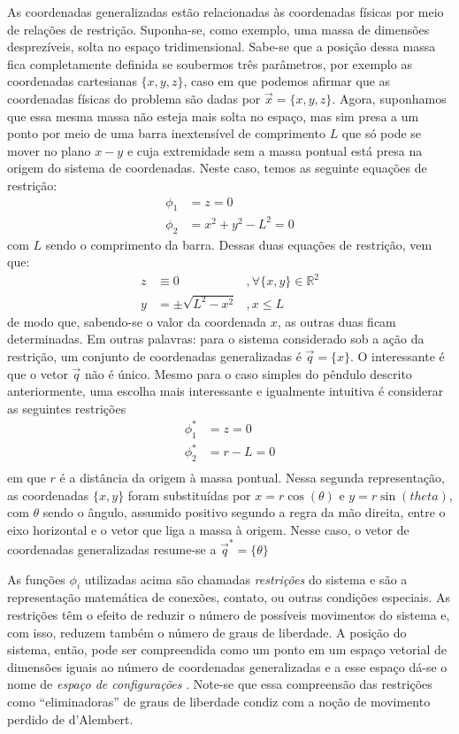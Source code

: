 As coordenadas generalizadas estão relacionadas às coordenadas físicas por meio de relações de restrição. 
Suponha-se, como exemplo, uma massa de dimensões desprezíveis, solta no espaço tridimensional. Sabe-se que a posição dessa massa fica completamente definida se soubermos três parâmetros, por exemplo as coordenadas cartesianas $\{x,y,z\}$, caso em que podemos afirmar que as coordenadas físicas do problema são dadas por $\vec{x} = \{x,y,z\}$. Agora, suponhamos que essa mesma massa não esteja mais solta no espaço, mas sim presa a um ponto por meio de uma barra inextensível de comprimento $L$ que só pode se mover no plano $x-y$ e cuja extremidade sem a massa pontual está presa na origem do sistema de coordenadas. Neste caso, temos as seguinte equações de restrição:
\begin{align}
 \phi_1 &= z = 0\\
 \phi_2 &= x^2 + y^2 - L^2 = 0
\end{align}
com $L$ sendo o comprimento da barra. Dessas duas equações de restrição, vem que:
\begin{align}
 z &\equiv 0 &, \forall \{x,y\} \in \mathbb{R}^2 \\
 y &= \pm \sqrt{L^2 - x^2} &, x \leq L
\end{align}
de modo que, sabendo-se o valor da coordenada $x$, as outras duas ficam determinadas. Em outras palavras: para o sistema considerado sob a ação da restrição, um conjunto de coordenadas generalizadas é $\vec{q} = \{x\}$. O interessante é que o vetor $\vec{q}$ não é único. Mesmo para o caso simples do pêndulo descrito anteriormente, uma escolha mais interessante e igualmente intuitiva é considerar as seguintes restrições
\begin{align}
 \phi_1^* &= z = 0\\
 \phi_2^* &= r - L = 0\\
\end{align}
em que $r$ é a distância da origem à massa pontual. Nessa segunda representação, as coordenadas $\{x,y\}$ foram substituídas por $x = r\cos(\theta)$ e $y = r\sin(theta)$, com $\theta$ sendo o ângulo, assumido positivo segundo a regra da mão direita, entre o eixo horizontal e o vetor que liga a massa à origem. Nesse caso, o vetor de coordenadas generalizadas resume-se a $\vec{q}^* = \{\theta\}$

As funções $\phi_i$ utilizadas acima são chamadas \textit{restrições} do sistema e são a representação matemática de conexões, contato, ou outras condições especiais. As restrições têm o efeito de reduzir o número de possíveis movimentos do sistema e, com isso, reduzem também o número de graus de liberdade. A posição do sistema, então, pode ser compreendida como um ponto em um espaço vetorial de dimensões iguais ao número de coordenadas generalizadas e a esse espaço dá-se o nome de \textit{espaço de configurações} \cite{corben_classical_1960}. Note-se que essa compreensão das restrições como ``eliminadoras'' de graus de liberdade condiz com a noção de movimento perdido de d'Alembert.

